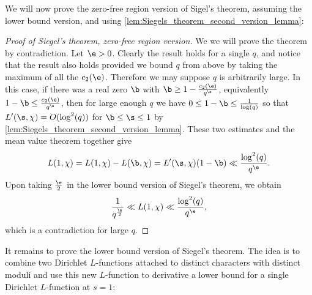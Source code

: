       We will now prove the zero-free region version of Sigel's theorem, assuming the lower bound version, and using \cref{lem:Siegels_theorem_second_version_lemma}:

      \begin{proof}[Proof of Siegel's theorem, zero-free region version]
        We we will prove the theorem by contradiction. Let $\e > 0$. Clearly the result holds for a single $q$, and notice that the result also holds provided we bound $q$ from above by taking the maximum of all the $c_{2}(\e)$. Therefore we may suppose $q$ is arbitrarily large. In this case, if there was a real zero $\b$ with $\b \ge 1-\frac{c_{2}(\e)}{q^{\e}}$, equivalently $1-\b \le \frac{c_{2}(\e)}{q^{\e}}$, then for large enough $q$ we have $0 \le 1-\b \le \frac{1}{\log(q)}$ so that $L'(\s,\chi) = O(\log^{2}(q))$ for $\b \le \s \le 1$ by \cref{lem:Siegels_theorem_second_version_lemma}. These two estimates and the mean value theorem together give
        \[
          L(1,\chi) = L(1,\chi)-L(\b,\chi) = L'(\s,\chi)(1-\b) \ll \frac{\log^{2}(q)}{q^{\e}}.
        \]
        Upon taking $\frac{\e}{2}$ in the lower bound version of Siegel's theorem, we obtain
        \[
          \frac{1}{q^{\frac{\e}{2}}} \ll L(1,\chi) \ll \frac{\log^{2}(q)}{q^{\e}},
        \]
        which is a contradiction for large $q$.
      \end{proof}

      It remains to prove the lower bound version of Siegel's theorem. The idea is to combine two Dirichlet $L$-functions attached to distinct characters with distinct moduli and use this new $L$-function to derivative a lower bound for a single Dirichlet $L$-function at $s = 1$:


